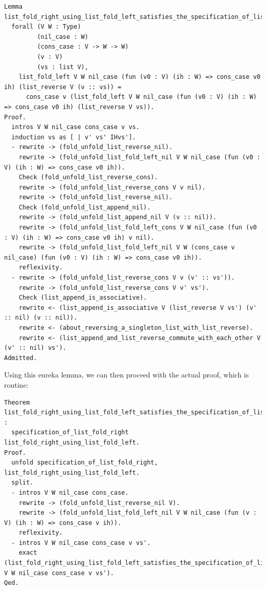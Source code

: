\documentclass{article}
\begin{document}
\begin{lstlisting}
Lemma list_fold_right_using_list_fold_left_satisfies_the_specification_of_list_fold_right_aux:
  forall (V W : Type)
         (nil_case : W)
         (cons_case : V -> W -> W)
         (v : V)
         (vs : list V),
    list_fold_left V W nil_case (fun (v0 : V) (ih : W) => cons_case v0 ih) (list_reverse V (v :: vs)) =
      cons_case v (list_fold_left V W nil_case (fun (v0 : V) (ih : W) => cons_case v0 ih) (list_reverse V vs)).
Proof.
  intros V W nil_case cons_case v vs.
  induction vs as [ | v' vs' IHvs'].
  - rewrite -> (fold_unfold_list_reverse_nil).
    rewrite -> (fold_unfold_list_fold_left_nil V W nil_case (fun (v0 : V) (ih : W) => cons_case v0 ih)).
    Check (fold_unfold_list_reverse_cons).
    rewrite -> (fold_unfold_list_reverse_cons V v nil).
    rewrite -> (fold_unfold_list_reverse_nil).
    Check (fold_unfold_list_append_nil).
    rewrite -> (fold_unfold_list_append_nil V (v :: nil)).
    rewrite -> (fold_unfold_list_fold_left_cons V W nil_case (fun (v0 : V) (ih : W) => cons_case v0 ih) v nil).
    rewrite -> (fold_unfold_list_fold_left_nil V W (cons_case v nil_case) (fun (v0 : V) (ih : W) => cons_case v0 ih)).
    reflexivity.
  - rewrite -> (fold_unfold_list_reverse_cons V v (v' :: vs')).
    rewrite -> (fold_unfold_list_reverse_cons V v' vs').
    Check (list_append_is_associative).
    rewrite <- (list_append_is_associative V (list_reverse V vs') (v' :: nil) (v :: nil)).
    rewrite <- (about_reversing_a_singleton_list_with_list_reverse).
    rewrite <- (list_append_and_list_reverse_commute_with_each_other V (v' :: nil) vs').
Admitted.
\end{lstlisting}

Using this eureka lemma, we can then proceed with the actual proof, which is routine:

\begin{lstlisting}
Theorem list_fold_right_using_list_fold_left_satisfies_the_specification_of_list_fold_right :
  specification_of_list_fold_right list_fold_right_using_list_fold_left.
Proof.
  unfold specification_of_list_fold_right, list_fold_right_using_list_fold_left.
  split.
  - intros V W nil_case cons_case.
    rewrite -> (fold_unfold_list_reverse_nil V).
    rewrite -> (fold_unfold_list_fold_left_nil V W nil_case (fun (v : V) (ih : W) => cons_case v ih)).
    reflexivity.
  - intros V W nil_case cons_case v vs'.
    exact (list_fold_right_using_list_fold_left_satisfies_the_specification_of_list_fold_right_aux V W nil_case cons_case v vs').
Qed.
\end{lstlisting}
\end{document}
